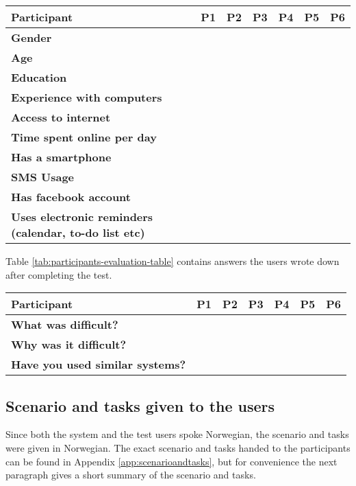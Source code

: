 \begin{sidewaystable}
	\begin{tabular}{ | p{3.5cm} | p{3.0cm} | p{3.0cm} | p{3.0cm} | p{3.0cm} | p{3.0cm} | p{3.0cm} |}
	\label{tab:participants-table}
	\hline
	\textbf{Participant} & P1 & P2 & P3 & P4 & P5 & P6 \\ \hline
	\textbf{Gender} & & & & & & \\ \hline
	\textbf{Age} & & & & & & \\ \hline
	\textbf{Education} & & & & & & \\ \hline
	\textbf{Experience with computers} & & & & & & \\ \hline
	\textbf{Access to internet} & & & & & & \\ \hline
	\textbf{Time spent online per day} & & & & & & \\ \hline
	\textbf{Has a smartphone} & & & & & & \\ \hline
	\textbf{SMS Usage} & & & & & & \\ \hline
	\textbf{Has facebook account} & & & & & & \\ \hline
	\textbf{Uses electronic reminders (calendar, to-do list etc)} & & & & & & \\ \hline
	\end{tabular}
	\caption{Participants' experience with IT solutions}
\end{sidewaystable}


Table \ref{tab:participants-evaluation-table} contains answers the users wrote down after completing the test.

\begin{sidewaystable}
	\begin{tabular}{ | p{3.5cm} | p{3.0cm} | p{3.0cm} | p{3.0cm} | p{3.0cm} | p{3.0cm} | p{3.0cm} | }
	\label{tab:participants-evaluation-table}
	\hline
	\textbf{Participant} & P1 & P2 & P3 & P4 & P5 & P6 \\ \hline
	\textbf{What was difficult?} & & & & & & \\ \hline
	\textbf{Why was it difficult?} & & & & & & \\ \hline
	\textbf{Have you used similar systems?} & & & & & & \\ \hline
	\end{tabular}
	\caption{Participants's opinions upon finishing the test}
\end{sidewaystable}



\subsection{Scenario and tasks given to the users}
Since both the system and the test users spoke Norwegian, the scenario and tasks were given in Norwegian. The exact scenario and tasks handed to the participants can be found in Appendix \ref{app:scenarioandtasks}, but for convenience the next paragraph gives a short summary of the scenario and tasks.

